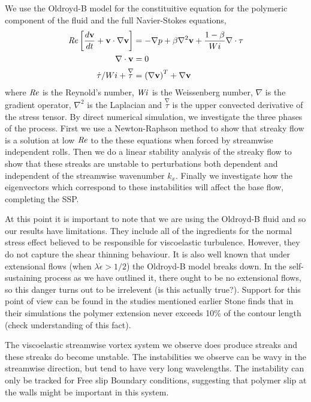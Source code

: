 \documentclass{jfm}
\newcommand\Wi{\mbox{\textit{Wi}}}
\newcommand{\dt}[1]{\frac{d #1}{d t}} %
\newcommand\Rey{\mbox{\textit{Re}}}  %
\begin{document}
We use the Oldroyd-B model for the constituitive equation for the polymeric component of the fluid and the full Navier-Stokes equations,
\begin{align}
    \Rey \left[ \dt{\mathbf{v}} + \mathbf{v} \cdot \nabla  \mathbf{v} \right] &= - \nabla p + \beta \nabla^{2} \mathbf{v} + \frac{1-\beta}{Wi} \nabla \cdot \mathbf{\tau} \label{eq:Navier-Stokes}\\
    \nabla \cdot \mathbf{v} &= 0 \label{eq:incompressibility}\\
    \dot{\tau}/Wi + \overset{\nabla}\tau &= \left(\nabla \mathbf{v}\right)^{T} + \nabla{\mathbf{v}}\label{eq:Oldroyd-B}
\end{align}
where $\Rey$ is the Reynold's number, $\Wi$ is the Weissenberg number, $\nabla$ is the gradient operator, $\nabla^{2}$ is the Laplacian and $ \overset{\nabla}\tau$ is the upper convected derivative of the stress tensor. By direct numerical simulation, we investigate the three phases of the process. First we use a Newton-Raphson method to show that streaky flow is a solution at low $\Rey$ to the these equations when forced by streamwise independent rolls. Then we do a linear stability analysis of the streaky flow to show that these streaks are unstable to perturbations both dependent and independent of the streamwise wavenumber $k_x$. Finally we investigate how the eigenvectors which correspond to these instabilities will affect the base flow, completing the SSP.

At this point it is important to note that we are using the Oldroyd-B fluid and so our results have limitations. They include all of the ingredients for the normal stress effect believed to be responsible for viscoelastic turbulence. However, they do not capture the shear thinning behaviour. It is also well known that under extensional flows (when $\lambda \dot{\epsilon} > 1/2$) the Oldroyd-B model breaks down. In the self-sustaining process as we have outlined it, there ought to be no extensional flows, so this danger turns out to be irrelevent (is this actually true?). Support for this point of view can be found in the studies mentioned earlier Stone \cite{Stone2004} finds that in their simulations the polymer extension never exceeds 10\% of the contour length (check understanding of this fact).

The viscoelastic streamwise vortex system we observe does produce streaks and these streaks do become unstable. The instabilities we observe can be wavy in the streamwise direction, but tend to have very long wavelengths. The instability can only be tracked for Free slip Boundary conditions, suggesting that polymer slip at the walls might be important in this system. 
\end{document}
